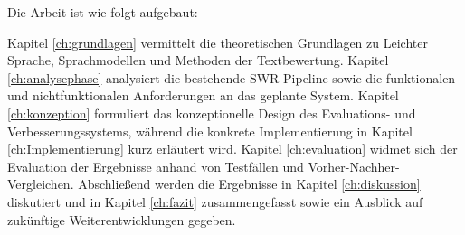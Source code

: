 Die Arbeit ist wie folgt aufgebaut:

Kapitel \ref{ch:grundlagen} vermittelt die theoretischen Grundlagen zu Leichter Sprache, Sprachmodellen und Methoden der Textbewertung. 
Kapitel \ref{ch:analysephase} analysiert die bestehende SWR-Pipeline sowie die funktionalen und nichtfunktionalen Anforderungen an das geplante System.
Kapitel \ref{ch:konzeption} formuliert das konzeptionelle Design des Evaluations- und Verbesserungssystems, während die konkrete Implementierung in Kapitel \ref{ch:Implementierung} kurz erläutert wird. 
Kapitel \ref{ch:evaluation} widmet sich der Evaluation der Ergebnisse anhand von Testfällen und Vorher-Nachher-Vergleichen. 
Abschließend werden die Ergebnisse in Kapitel \ref{ch:diskussion} diskutiert und in Kapitel \ref{ch:fazit} zusammengefasst sowie ein Ausblick auf zukünftige Weiterentwicklungen gegeben.